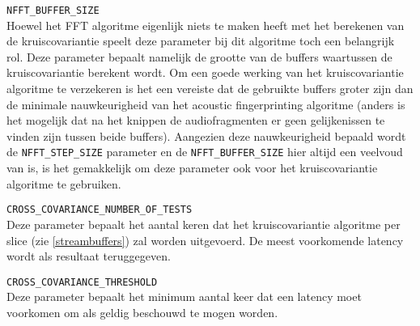 \begin{description}	
	\item\texttt{NFFT\_BUFFER\_SIZE} \hfill \\
	Hoewel het FFT algoritme eigenlijk niets te maken heeft met het berekenen van de kruiscovariantie speelt deze parameter bij dit algoritme toch een belangrijk rol. Deze parameter bepaalt namelijk de grootte van de buffers waartussen de kruiscovariantie berekent wordt. Om een goede werking van het kruiscovariantie algoritme te verzekeren is het een vereiste dat de gebruikte buffers groter zijn dan de minimale nauwkeurigheid van het acoustic fingerprinting algoritme (anders is het mogelijk dat na het knippen de audiofragmenten er geen gelijkenissen te vinden zijn tussen beide buffers). Aangezien deze nauwkeurigheid bepaald wordt de \texttt{NFFT\_STEP\_SIZE} parameter en de \texttt{NFFT\_BUFFER\_SIZE} hier altijd een veelvoud van is, is het gemakkelijk om deze parameter ook voor het kruiscovariantie algoritme te gebruiken. \newpage
	
	\item\texttt{CROSS\_COVARIANCE\_NUMBER\_OF\_TESTS} \hfill \\
	Deze parameter bepaalt het aantal keren dat het kruiscovariantie algoritme per slice (zie \ref{streambuffers}) zal worden uitgevoerd. De meest voorkomende latency wordt als resultaat teruggegeven.
	
	\item\texttt{CROSS\_COVARIANCE\_THRESHOLD} \hfill \\
	Deze parameter bepaalt het minimum aantal keer dat een latency moet voorkomen om als geldig beschouwd te mogen worden.
	
\end{description}

